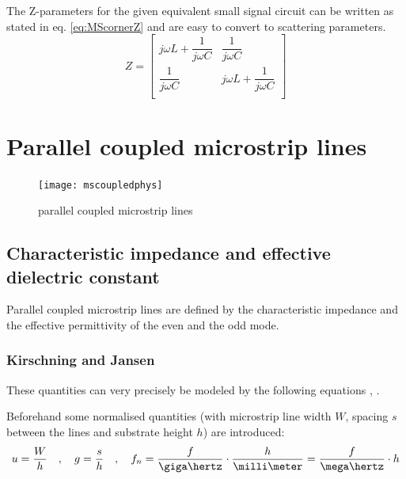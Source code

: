 \documentclass[10pt]{report}
\begin{document}
The Z-parameters for the given equivalent small signal circuit can be
written as stated in eq. \eqref{eq:MScornerZ} and are easy to convert
to scattering parameters.
\begin{equation}
Z =
\begin{bmatrix}
j\omega L + \dfrac{1}{j\omega C} & \dfrac{1}{j\omega C}\\
\dfrac{1}{j\omega C} & j\omega L + \dfrac{1}{j\omega C}\\
\end{bmatrix}
\label{eq:MScornerZ}
\end{equation}

\section{Parallel coupled microstrip lines}

\begin{figure}[ht]
\begin{center}
\texttt{[image: mscoupledphys]}
\end{center}
\caption{parallel coupled microstrip lines}
\label{fig:McoupledPhys}
\end{figure}
\FloatBarrier

\subsection{Characteristic impedance and effective dielectric constant}

Parallel coupled microstrip lines are defined by the characteristic
impedance and the effective permittivity of the even and the odd mode.

\subsubsection{Kirschning and Jansen}

These quantities can very precisely be modeled by the following
equations \cite{Kirschning2}, \cite{Kirschning6}.

\addvspace{12pt}

Beforehand some normalised quantities (with microstrip line width $W$,
spacing $s$ between the lines and substrate height $h$) are
introduced:
\begin{equation}
u = \dfrac{W}{h} \quad,\quad g = \dfrac{s}{h} \quad,\quad
f_n = \dfrac{f}{\giga\hertz}\cdot\dfrac{h}{\milli\meter} = \dfrac{f}{\mega\hertz}\cdot h
\end{equation}
\end{document}
